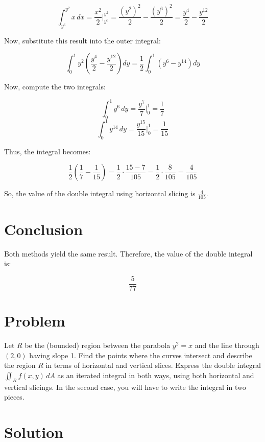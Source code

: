 \documentclass[11pt]{article}
\begin{document}
\[
\int_{y^6}^{y^2} x \, dx = \frac{x^2}{2} \bigg|_{y^6}^{y^2} = \frac{(y^2)^2}{2} - \frac{(y^6)^2}{2} = \frac{y^4}{2} - \frac{y^{12}}{2}
\]

Now, substitute this result into the outer integral:

\[
\int_0^1 y^2 \left( \frac{y^4}{2} - \frac{y^{12}}{2} \right) dy = \frac{1}{2} \int_0^1 \left( y^6 - y^{14} \right) dy
\]

Now, compute the two integrals:

\[
\int_0^1 y^6 \, dy = \frac{y^7}{7} \bigg|_0^1 = \frac{1}{7}
\]
\[
\int_0^1 y^{14} \, dy = \frac{y^{15}}{15} \bigg|_0^1 = \frac{1}{15}
\]

Thus, the integral becomes:

\[
\frac{1}{2} \left( \frac{1}{7} - \frac{1}{15} \right) = \frac{1}{2} \cdot \frac{15 - 7}{105} = \frac{1}{2} \cdot \frac{8}{105} = \frac{4}{105}
\]

So, the value of the double integral using horizontal slicing is \( \frac{4}{105} \).

\newpage

\section{Conclusion}

Both methods yield the same result. Therefore, the value of the double integral is:

\[
\boxed{\frac{5}{77}}
\]




\maketitle

\newpage

\section{Problem}
Let \( R \) be the (bounded) region between the parabola \( y^2 = x \) and the line through \( (2, 0) \) having slope 1. Find the points where the curves intersect and describe the region \( R \) in terms of horizontal and vertical slices. Express the double integral \( \iint_R f(x, y) \, dA \) as an iterated integral in both ways, using both horizontal and vertical slicings. In the second case, you will have to write the integral in two pieces.

\newpage

\section{Solution}
\end{document}
